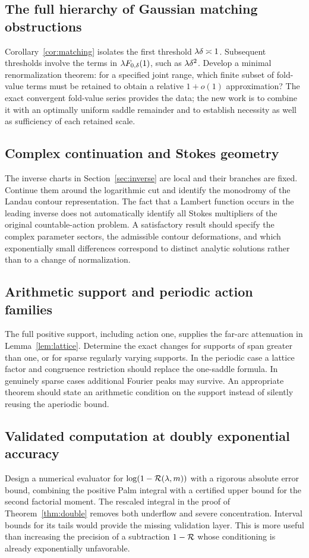 \documentclass[11pt,a4paper]{article}
\numberwithin{equation}{section}
\theoremstyle{definition}
\theoremstyle{remark}
\begin{document}
\subsection{The full hierarchy of Gaussian matching obstructions}
Corollary~\ref{cor:matching} isolates the first threshold
\(\lambda\delta\asymp1\). Subsequent thresholds involve the terms in
\(\lambda F_{0,\delta}(1)\), such as \(\lambda\delta^2\).
Develop a minimal renormalization theorem: for a specified joint range,
which finite subset of fold-value terms must be retained to obtain a
relative \(1+o(1)\) approximation? The exact convergent fold-value series
provides the data; the new work is to combine it with an optimally
uniform saddle remainder and to establish necessity as well as
sufficiency of each retained scale.

\subsection{Complex continuation and Stokes geometry}
The inverse charts in Section~\ref{sec:inverse} are local and their
branches are fixed. Continue them around the logarithmic cut and
identify the monodromy of the Landau contour representation.
The fact that a Lambert function occurs in the leading inverse does
not automatically identify all Stokes multipliers of the original
countable-action problem. A satisfactory result should specify the
complex parameter sectors, the admissible contour deformations, and
which exponentially small differences correspond to distinct analytic
solutions rather than to a change of normalization.

\subsection{Arithmetic support and periodic action families}
The full positive support, including action one, supplies the far-arc
attenuation in Lemma~\ref{lem:lattice}. Determine the exact changes for
supports of span greater than one, or for sparse regularly varying
supports. In the periodic case a lattice factor and congruence
restriction should replace the one-saddle formula. In genuinely sparse
cases additional Fourier peaks may survive. An appropriate theorem
should state an arithmetic condition on the support instead of silently
reusing the aperiodic bound.

\subsection{Validated computation at doubly exponential accuracy}
Design a numerical evaluator for \(\log(1-\mathcal R(\lambda,m))\) with a rigorous
absolute error bound, combining the positive Palm integral with a
certified upper bound for the second factorial moment.
The rescaled integral in the proof of Theorem~\ref{thm:double} removes
both underflow and severe concentration. Interval bounds for its tails
would provide the missing validation layer. This is more useful than
increasing the precision of a subtraction \(1-\mathcal R\) whose conditioning
is already exponentially unfavorable.
\end{document}
